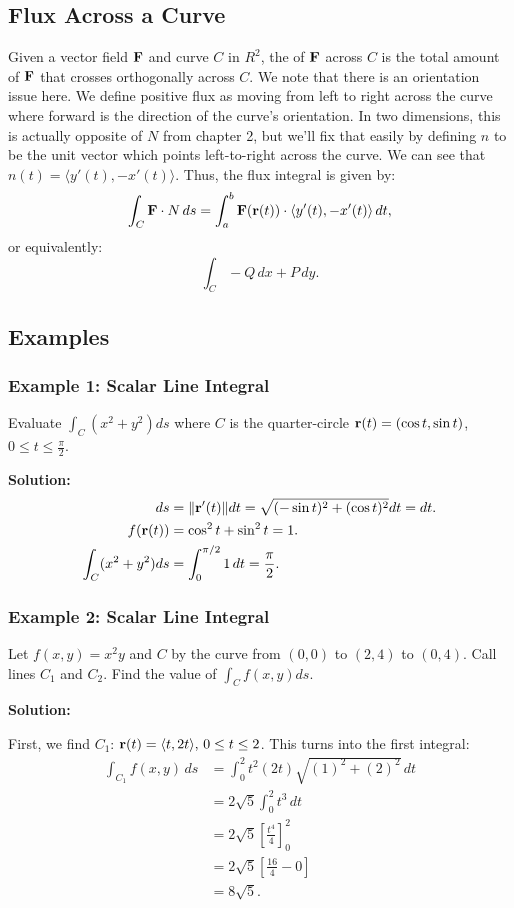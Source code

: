 \subsection{Flux Across a Curve}
Given a vector field \(\mathbf{F}\) and curve \(C\) in \(R^{2}\), the  of \(\mathbf{F}\) across \(C\) is the total amount of \(\mathbf{F}\) that crosses orthogonally across \(C\). We note that there is an orientation issue here. We define positive flux as moving from left to right across the curve where forward is the direction of the curve’s orientation. In two dimensions, this is actually opposite of \(N\) from chapter 2, but we’ll fix that easily by defining \(n\) to be the unit vector which points left-to-right across the curve. We can see that \(n(t) = \langle y'(t), -x'(t) \rangle\).
Thus, the flux integral is given by:
\[ \int_C \mathbf{F} \cdot N \, ds = \int_a^b \mathbf{F}(\mathbf{r}(t)) \cdot \langle y'(t), -x'(t) \rangle \, dt, \]
or equivalently:
\[ \int_C -Q \, dx + P \, dy. \]

\subsection{Examples}
\subsubsection{Example 1: Scalar Line Integral}
Evaluate \( \int_C (x^2 + y^2) ds \) where \( C \) is the quarter-circle \( \mathbf{r}(t) = (\cos t, \sin t) \), \( 0 \leq t \leq \frac{\pi}{2} \).

\textbf{Solution:}
\begin{align*}
    ds &= \|\mathbf{r}'(t)\| dt = \sqrt{(-\sin t)^2 + (\cos t)^2} dt = dt. \\
    f(\mathbf{r}(t)) &= \cos^2 t + \sin^2 t = 1. \\
    \int_C (x^2 + y^2) ds &= \int_0^{\pi/2} 1 \, dt = \frac{\pi}{2}.
\end{align*}

\subsubsection{Example 2: Scalar Line Integral}
Let \(f(x,y) = x^{2}y\) and \(C\) by the curve from \((0,0)\) to \((2,4)\) to \((0,4)\). Call lines \(C_1\) and \(C_2\). Find the value of \(\int_C f(x,y) ds\).

\textbf{Solution:}

First, we find \(C_{1}\): \(\mathbf{r}(t) = \langle t,2t\rangle, \, 0 \leq t \leq 2\). This turns into the first integral:
\begin{align*}
    \int_{C_{1}} f(x,y) \, ds &= \int_{0}^{2} t^{2}(2t) \sqrt{(1)^{2} + (2)^{2}} \, dt \\
    &= 2\sqrt{5} \int_{0}^{2} t^{3}  \, dt \\
    &= 2\sqrt{5} \left[ \tfrac{t^{4}}{4} \right]_{0}^{2} \\
    &= 2\sqrt{5} \left[ \tfrac{16}{4} - 0 \right] \\
    &= 8\sqrt{5}.
\end{align*}


